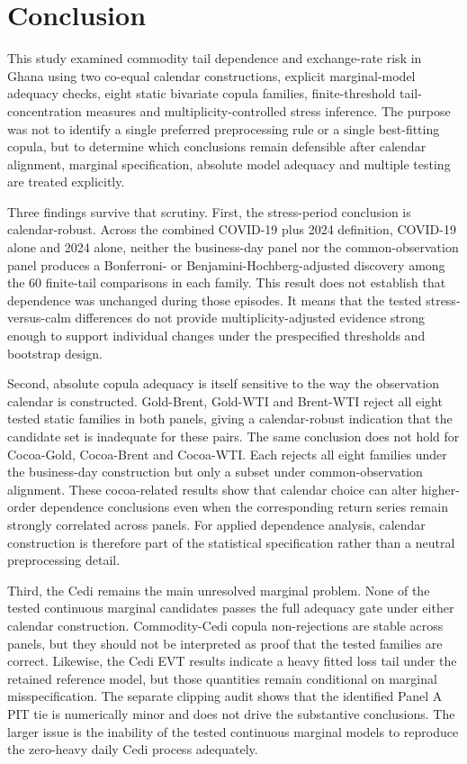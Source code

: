 \section{Conclusion}
\label{sec:conclusion}

This study examined commodity tail dependence and exchange-rate risk in Ghana using two co-equal calendar constructions, explicit marginal-model adequacy checks, eight static bivariate copula families, finite-threshold tail-concentration measures and multiplicity-controlled stress inference. The purpose was not to identify a single preferred preprocessing rule or a single best-fitting copula, but to determine which conclusions remain defensible after calendar alignment, marginal specification, absolute model adequacy and multiple testing are treated explicitly.

Three findings survive that scrutiny. First, the stress-period conclusion is calendar-robust. Across the combined COVID-19 plus 2024 definition, COVID-19 alone and 2024 alone, neither the business-day panel nor the common-observation panel produces a Bonferroni- or Benjamini-Hochberg-adjusted discovery among the 60 finite-tail comparisons in each family. This result does not establish that dependence was unchanged during those episodes. It means that the tested stress-versus-calm differences do not provide multiplicity-adjusted evidence strong enough to support individual changes under the prespecified thresholds and bootstrap design.

Second, absolute copula adequacy is itself sensitive to the way the observation calendar is constructed. Gold-Brent, Gold-WTI and Brent-WTI reject all eight tested static families in both panels, giving a calendar-robust indication that the candidate set is inadequate for these pairs. The same conclusion does not hold for Cocoa-Gold, Cocoa-Brent and Cocoa-WTI. Each rejects all eight families under the business-day construction but only a subset under common-observation alignment. These cocoa-related results show that calendar choice can alter higher-order dependence conclusions even when the corresponding return series remain strongly correlated across panels. For applied dependence analysis, calendar construction is therefore part of the statistical specification rather than a neutral preprocessing detail.

Third, the Cedi remains the main unresolved marginal problem. None of the tested continuous marginal candidates passes the full adequacy gate under either calendar construction. Commodity-Cedi copula non-rejections are stable across panels, but they should not be interpreted as proof that the tested families are correct. Likewise, the Cedi EVT results indicate a heavy fitted loss tail under the retained reference model, but those quantities remain conditional on marginal misspecification. The separate clipping audit shows that the identified Panel A PIT tie is numerically minor and does not drive the substantive conclusions. The larger issue is the inability of the tested continuous marginal models to reproduce the zero-heavy daily Cedi process adequately.

